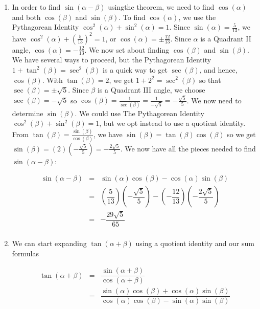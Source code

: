 \documentclass{ximera}
\begin{document}
\begin{example}
\begin{enumerate}
\item  In order to find $\sin(\alpha - \beta)$ usingthe theorem, we need to find $\cos(\alpha)$ and both $\cos(\beta)$ and $\sin(\beta)$.  To find $\cos(\alpha)$, we use the Pythagorean Identity $\cos^2(\alpha) + \sin^2(\alpha) = 1$.  Since $\sin(\alpha) = \frac{5}{13}$, we have $\cos^{2}(\alpha) + \left(\frac{5}{13}\right)^2 = 1$, or $\cos(\alpha) = \pm \frac{12}{13}$.  Since $\alpha$ is a Quadrant II angle, $\cos(\alpha) = -\frac{12}{13}$. We now set about finding $\cos(\beta)$ and $\sin(\beta)$.  We have several ways to proceed, but the Pythagorean Identity $1 + \tan^{2}(\beta) = \sec^{2}(\beta)$ is a quick way to get $\sec(\beta)$, and hence, $\cos(\beta)$.  With $\tan(\beta) = 2$, we get $1 + 2^2 = \sec^{2}(\beta)$ so that $\sec(\beta) = \pm \sqrt{5}$.  Since $\beta$ is a Quadrant III angle,  we choose $\sec(\beta) =  -\sqrt{5}$ so $\cos(\beta) = \frac{1}{\sec(\beta)} = \frac{1}{-\sqrt{5}} = -\frac{\sqrt{5}}{5}$.  We now need to determine $\sin(\beta)$.  We could use The Pythagorean Identity $\cos^{2}(\beta) + \sin^{2}(\beta) = 1$, but we opt instead to use a quotient identity.  From $\tan(\beta) = \frac{\sin(\beta)}{\cos(\beta)}$, we have $\sin(\beta) = \tan(\beta) \cos(\beta)$ so we get $\sin(\beta) = (2) \left( -\frac{\sqrt{5}}{5}\right) = - \frac{2 \sqrt{5}}{5}$.  We now have all the pieces needed to find $\sin(\alpha - \beta)$:

\[ \begin{array}{rcl} 
\sin(\alpha - \beta) &  = & \sin(\alpha)\cos(\beta) - \cos(\alpha)\sin(\beta) \\
 										 & = & \left( \dfrac{5}{13} \right)\left( -\dfrac{\sqrt{5}}{5} \right) - \left( -\dfrac{12}{13} \right)\left( - \dfrac{2 \sqrt{5}}{5} \right) \\
 										 & = & -\dfrac{29\sqrt{5}}{65} \\
\end{array}\]

\item  We can start expanding $\tan(\alpha + \beta)$ using a quotient identity and our sum formulas

\vspace{-.1in}

\[ \begin{array}{rcl}

\tan(\alpha + \beta) & = & \dfrac{\sin(\alpha + \beta)}{\cos(\alpha + \beta)} \\ [10pt]
                     & = & \dfrac{\sin(\alpha) \cos(\beta) + \cos(\alpha) \sin(\beta)}{\cos(\alpha) \cos(\beta) - \sin(\alpha) \sin(\beta)} \\ \end{array} \]
			


\end{enumerate}
\end{example}
\end{document}
